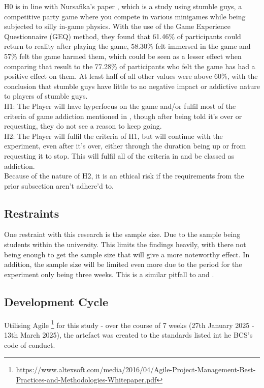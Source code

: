 \documentclass[conference]{IEEEtran}
\begin{document}
H0 is in line with Nursafika's paper \cite{Nursafika2024}, which is a study using stumble guys, a competitive party game where you compete in various minigames while being subjected to silly in-game physics. With the use of the Game Experience Questionnaire (GEQ) method, they found that 61.46\% of participants could return to reality after playing the game, 58.30\% felt immersed in the game and 57\% felt the game harmed them, which could be seen as a lesser effect when comparing that result to the 77.28\% of participants who felt the game has had a positive effect on them. At least half of all other values were above 60\%,  with the conclusion that stumble guys have little to no negative impact or addictive nature to players of stumble guys.\\

H1: The Player will have hyperfocus on the game and/or fulfil most of the criteria of game addiction mentioned in \cite{NHSHamp24}, though after being told it's over or requesting, they do not see a reason to keep going.\\

H2: The Player will fulfil the criteria of H1, but will continue with the experiment, even after it's over, either through the duration being up or from requesting it to stop. This will fulfil all of the criteria in \cite{NHSHamp24} and be classed as addiction. \\

Because of the nature of H2, it is an ethical risk if the requirements from the prior subsection aren't adhere'd to.

\subsection {Restraints}
One restraint with this research is the sample size. Due to the sample being students within the university. This limits the findings heavily, with there not being enough to get the sample size that will give a more noteworthy effect. In addition, the sample size will be limited even more due to the period for the experiment only being three weeks. This is a similar pitfall to \cite{Naaj2021} and \cite{Ruqeyya2022}.\\

\subsection{Development Cycle}
Utilising Agile \footnote{\url{https://www.altexsoft.com/media/2016/04/Agile-Project-Management-Best-Practices-and-Methodologies-Whitepaper.pdf}} for this study - over the course of 7 weeks (27th January 2025 - 13th March 2025), the artefact was created to the standards listed int he BCS's code of conduct.
\end{document}
